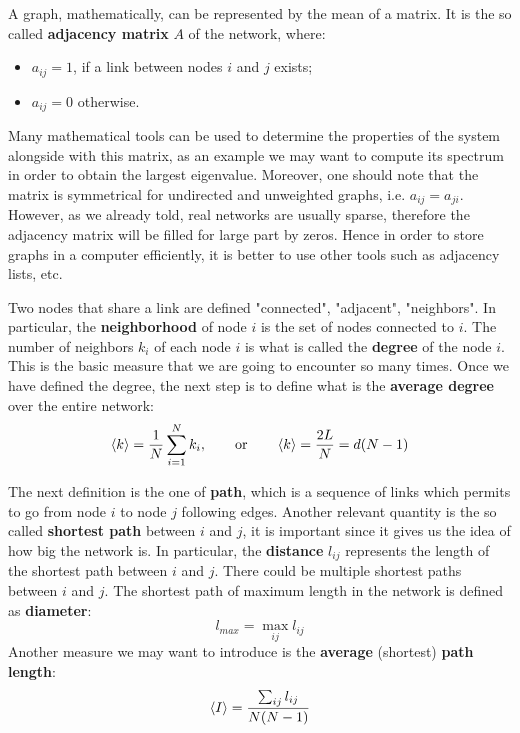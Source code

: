 \documentclass[../main/main.tex]{subfiles}
\begin{document}
A graph, mathematically, can be represented by the mean of a matrix. It is the so called \textbf{adjacency matrix} \( A \) of the network, where:
\begin{itemize}
\item \( a_{ij} = 1 \), if a link between nodes \( i \) and \( j \) exists;
\item \( a_{ij} = 0 \) otherwise.
\end{itemize}
Many mathematical tools can be used to determine the properties of the system alongside with this matrix, as an example we may want to compute its spectrum in order to obtain the largest eigenvalue. Moreover, one should note that the matrix is symmetrical for undirected and unweighted graphs, i.e. \( a_{ij} = a_{ji} \).
However, as we already told, real networks are usually sparse, therefore the adjacency matrix will be filled for large part by zeros. Hence in order to store graphs in a computer efficiently, it is better to use other tools such as adjacency lists, etc.

Two nodes that share a link are defined "connected", "adjacent", "neighbors". In particular, the \textbf{neighborhood} of node \( i \) is the set of nodes connected to \( i \).
The number of neighbors \( k_i \) of each node \( i \) is what is called the \textbf{degree} of the node $i$. This is the basic measure that we are going to encounter so many times. Once we have defined the degree, the next step is to define what is the \textbf{average degree} over the entire network:
\begin{equation}
  \expval{k} = \frac{1}{N} \sum_{i=1}^{N} k_i, \qquad \text{or} \qquad \expval{k} = \frac{2L}{N} = d(N-1)
\end{equation}

The next definition is the one of \textbf{path}, which is a sequence of links which permits to go from node \( i \) to node \( j \) following edges. Another relevant quantity is the so called \textbf{shortest path} between \( i \) and \( j \), it is important since it gives us the idea of how big the network is. In particular, the \textbf{distance} \( l_{ij} \) represents the length of the shortest path between \( i \) and \( j \). There could be multiple shortest paths between \( i \) and \( j \).
The shortest path of maximum length in the network is defined as \textbf{diameter}:
\begin{equation*}
  l_{max} = \max_{ij} l_{ij}
\end{equation*}
Another measure we may want to introduce is the \textbf{average} (shortest) \textbf{path length}:
\begin{equation*}
  \expval{I} = \frac{\sum_{ij}^{} l_{ij} }{N(N-1)}
\end{equation*}
\end{document}
